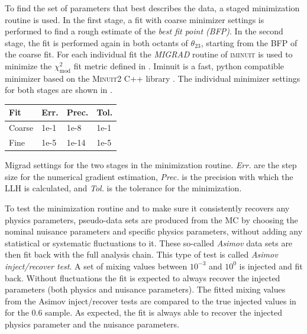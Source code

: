 To find the set of parameters that best describes the data, a staged minimization routine is used. In the first stage, a fit with coarse minimizer settings is performed to find a rough estimate of the \textit{best fit point (BFP)}. In the second stage, the fit is performed again in both octants of $\theta_{23}$, starting from the BFP of the coarse fit. For each individual fit the \textit{MIGRAD} routine of \textsc{iminuit}  is used to minimize the $\chi^2_{\mathrm{mod}}$ fit metric defined in . Iminuit is a fast, python compatible minimizer based on the \textsc{Minuit2} C++ library . The individual minimizer settings for both stages are shown in .

\begin{margintable}
    \small
        \begin{tabular}{ llll }
        \hline\hline
        \textbf{Fit} & \textbf{Err.} & \textbf{Prec.} & \textbf{Tol.} \\
        \hline\hline
        Coarse & 1e-1 & 1e-8 & 1e-1 \\
        Fine & 1e-5 & 1e-14 & 1e-5 \\
        \hline
        \end{tabular}
    \caption[Staged minimization routine settings]{Migrad settings for the two stages in the minimization routine. \textit{Err.} are the step size for the numerical gradient estimation, \textit{Prec.} is the precision with which the LLH is calculated, and \textit{Tol.} is the tolerance for the minimization.}
\end{margintable}

To test the minimization routine and to make sure it consistently recovers any physics parameters, pseudo-data sets are produced from the MC by choosing the nominal nuisance parameters and specific physics parameters, without adding any statistical or systematic fluctuations to it. These so-called \textit{Asimov} data sets are then fit back with the full analysis chain. This type of test is called \textit{Asimov inject/recover test}. A set of mixing values between $10^{-3}$ and $10^{0}$ is injected and fit back.
Without fluctuations the fit is expected to always recover the injected parameters (both physics and nuisance parameters). The fitted mixing values from the Asimov inject/recover tests are compared to the true injected values in  for the \SI{0.6}{\gev} sample. As expected, the fit is always able to recover the injected physics parameter and the nuisance parameters.

